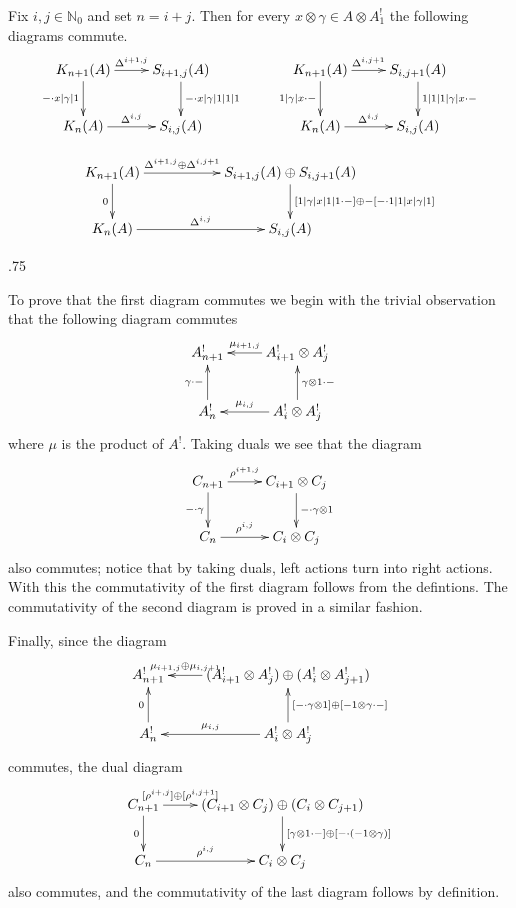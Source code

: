 \documentclass[11pt,fleqn]{article}
\makeatletter
\renewenvironment{proof}[1][\proofname]{\par
  \pushQED{\qed}%
  \normalfont \topsep.75\paraskip\relax
  \trivlist
  \item[\hskip\labelsep
        \itshape
    #1\@addpunct{.}]\ignorespaces
}{%
  \popQED\endtrivlist\@endpefalse
}
\newcommand\NN{\mathbb N}
\newcommand\ot{\otimes}
\makeatother
\begin{document}
\begin{Lemma*}
Fix $i,j \in \NN_0$ and set $n = i + j$. Then for every $x \ot \gamma \in A \ot A^!_1$ 
the following diagrams commute.
\begin{align*}
\xymatrix{
	 K_{n+1}(A)
		\ar[r]^-{\Delta^{i+1,j}} 
		\ar[d]_-{- \cdot x | \gamma |1}
	& S_{i+1,j}(A) 
		\ar[d]^-{- \cdot x |\gamma| 1 | 1 | 1} 
	&& K_{n+1}(A)
		\ar[r]^-{\Delta^{i,j+1}} 
		\ar[d]_-{1|\gamma|x \cdot -}
	& S_{i, j+1}(A)
		\ar[d]^-{ 1 | 1 |1| \gamma|x \cdot -}\\
	K_n(A)
		\ar[r]^-{\Delta^{i,j}} 
	& S_{i,j}(A)
	&& K_n(A)
		\ar[r]^-{\Delta^{i,j}} 
	& S_{i,j}(A)
}
\end{align*}

\begin{align*}
\xymatrix{
	K_{n+1}(A) 
		\ar[rr]^-{\Delta^{i+1,j}\oplus \Delta^{i,j+1}} \ar[d]_-0 
	&& S_{i+1,j}(A) \oplus S_{i,j+1}(A)
		\ar[d]^-{[1|\gamma|x|1|1 \cdot -] \oplus -[- \cdot 1|1|x|\gamma|1]} \\
	K_{n}(A)
		\ar[rr]^-{\Delta^{i,j}} 
	&& S_{i,j}(A)
}
\end{align*}
\end{Lemma*}
\begin{proof}
To prove that the first diagram commutes we begin with the trivial observation that the 
following diagram commutes
\begin{align*}
\xymatrix{
	A^!_{n+1} 
	& A_{i+1}^! \ot A_j^! 
		\ar[l]_-{\mu_{i+1,j}} \\
	A_n^!
		\ar[u]^-{\gamma \cdot -}
	& A^!_i \ot A_j^!
		\ar[u]_-{\gamma \ot 1 \cdot -}
		\ar[l]_-{\mu_{i,j}} 
}
\end{align*}
where $\mu$ is the product of $A^!$. Taking duals we see that the diagram
\begin{align*}
\xymatrix{
	 C_{n+1} 
		\ar[r]^-{\rho^{i+1,j}} 
		\ar[d]_-{- \cdot \gamma}
	& C_{i+1} \ot C_j 
		\ar[d]^-{- \cdot \gamma \ot 1}\\
	C_n
		\ar[r]^-{\rho^{i,j}} 
	& C_i \ot C_j
}
\end{align*}
also commutes; notice that by taking duals, left actions turn into right actions. With 
this the commutativity of the first diagram follows from the defintions. The 
commutativity of the second diagram is proved in a similar fashion.

Finally, since the diagram 
\begin{align*}
\xymatrix{
	A^!_{n+1} 
	& (A^!_{i+1} \ot A^!_j) \oplus (A^!_i \ot A^!_{j+1})
		\ar[l]_-{\mu_{i+1,j} \oplus \mu_{i,j+1}} \\
	A^!_{n} 
		\ar[u]^-0
	& A^!_i \ot A^!_j 
		\ar[u]_-{[- \cdot \gamma \ot 1] \oplus [- 1 \ot \gamma \cdot -]} 
		\ar[l]_-{\mu_{i,j}}
}
\end{align*}
commutes, the dual diagram
\begin{align*}
\xymatrix{
	C_{n+1} 
		\ar[r]^-{[\rho^{i+,j}] \oplus [\rho^{i,j+1}]}
		\ar[d]_-0
	& (C_{i+1} \ot C_j) \oplus (C_i \ot C_{j+1})
		\ar[d]^-{[\gamma \ot 1 \cdot -] \oplus [- \cdot (- 1 \ot \gamma)]}\\
	C_n 
		\ar[r]^-{\rho^{i,j}}
	& C_i \ot C_j
}
\end{align*}
also commutes, and the commutativity of the last diagram follows by definition.
\end{proof}
\end{document}
